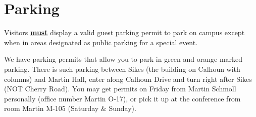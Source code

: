 \documentclass[a4paper,10pt,foldmark,notumble]{leaflet}
\begin{document}
\section{Parking}
Visitors \underline{\bf must} display a valid guest parking permit to
park on campus except when in areas designated as public parking for a
special event.


We have parking permits that allow you to park in green and orange
marked parking. There is such parking between Sikes (the building on
Calhoun with columns) and Martin Hall, enter along Calhoun Drive and
turn right after Sikes (NOT Cherry Road). You may get permits on Friday
from Martin Schmoll personally (office number Martin O-17), or pick it
up at the conference from room Martin M-105 (Saturday \& Sunday).
%
%
%
%
%
%
%
%
%
%
%
%
%
\cleardoublepage
\newpage
\end{document}
